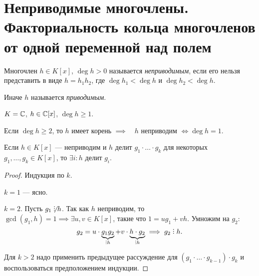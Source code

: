 \section{Неприводимые многочлены. Факториальность кольца многочленов от одной переменной над полем}

\begin{definition}
    Многочлен $h \in K[x]$, $\deg h > 0$ называется \textit{неприводимым}, если его нельзя представить в виде $h = h_1 h_2$, где $\deg h_1 < \deg h$ и $\deg h_2 < \deg h$.

    Иначе $h$ называется \textit{приводимым}.
\end{definition}

\begin{comment}~
    \begin{enumerate}
        \item $h \in K[x]$, $\deg h = 1 \implies h $ неприводим;
        \item $h \in K[x]$, $\deg g \geq 2$, $h $ неприводим $ \implies h$ не имеет корней в $K$ (следствие теоремы Безу);
        \item $h \in K[x]$, $\deg h \in \{2, 3\} \implies \left[h \text{ неприводим } \iff h \text{ не имеет корней в $K$}\right]$.
    \end{enumerate}
\end{comment}

\begin{example}
    $K = \mathbb{C}$, $h \in \mathbb{C}[x]$, $\deg h \geq 1$.

    Если $\deg h \geq 2$, то $h$ имеет корень $ \implies \quad h$ неприводим $\iff \deg h = 1$. 
\end{example}

\begin{lemma}
    Если $h \in K[x]$ --- неприводим и $h$ делит $g_1 \cdot \ldots \cdot g_k$ для некоторых $g_1, \dots, g_k \in K[x]$, то $\exists i : h$ делит $g_i$.
\end{lemma}

\begin{proof}
    Индукция по $k$.

    $k = 1$ --- ясно.

    $k = 2$. Пусть $g_1 \not\divby h$. Так как $h$ неприводим, то $\gcd(g_1, h) = 1 \implies \exists u, v \in K[x]$, такие что $1 = ug_1 + vh$. Умножим на $g_2$:
    \begin{equation*}
        g_2 = u \cdot \underbrace{g_1 g_2}_{\divby h} + v \cdot \underbrace{h \cdot g_2}_{\divby h} \implies g_2 \divby h
    .\end{equation*}

    Для $k > 2$ надо применить предыдущее рассуждение для $(g_1 \cdot \ldots \cdot g_{k - 1}) \cdot g_k$ и воспользоваться предположением индукции.
\end{proof}

